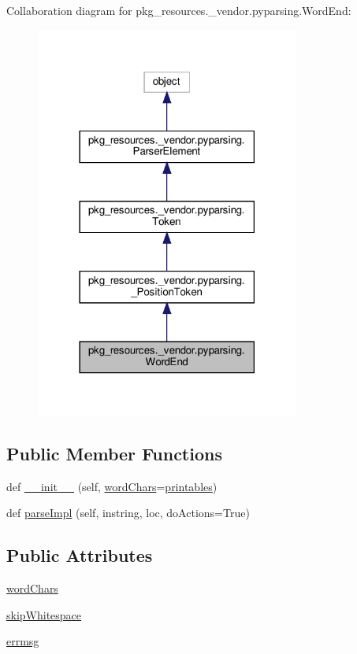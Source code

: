 Collaboration diagram for pkg\+\_\+resources.\+\_\+vendor.\+pyparsing.\+Word\+End\+:
\nopagebreak
\begin{figure}[H]
\begin{center}
\leavevmode
\includegraphics[width=246pt]{classpkg__resources_1_1__vendor_1_1pyparsing_1_1WordEnd__coll__graph}
\end{center}
\end{figure}
\subsection*{Public Member Functions}
\begin{DoxyCompactItemize}
\item 
def \hyperlink{classpkg__resources_1_1__vendor_1_1pyparsing_1_1WordEnd_a61b04aa7ea3458523c747fb3e3b5789b}{\+\_\+\+\_\+init\+\_\+\+\_\+} (self, \hyperlink{classpkg__resources_1_1__vendor_1_1pyparsing_1_1WordEnd_aae7adb6c9f28333a4a02177c02982f0b}{word\+Chars}=\hyperlink{namespacepkg__resources_1_1__vendor_1_1pyparsing_af6012db114d431b92334582e9f73eae2}{printables})
\item 
def \hyperlink{classpkg__resources_1_1__vendor_1_1pyparsing_1_1WordEnd_a8fa96ea9d8026ecc9dae92e526d629d8}{parse\+Impl} (self, instring, loc, do\+Actions=True)
\end{DoxyCompactItemize}
\subsection*{Public Attributes}
\begin{DoxyCompactItemize}
\item 
\hyperlink{classpkg__resources_1_1__vendor_1_1pyparsing_1_1WordEnd_aae7adb6c9f28333a4a02177c02982f0b}{word\+Chars}
\item 
\hyperlink{classpkg__resources_1_1__vendor_1_1pyparsing_1_1WordEnd_a280f4f5fb0fe0ffbfb264ec1064dab2c}{skip\+Whitespace}
\item 
\hyperlink{classpkg__resources_1_1__vendor_1_1pyparsing_1_1WordEnd_a7b5e89c9b3d36ca95461b35908c7a414}{errmsg}
\end{DoxyCompactItemize}

